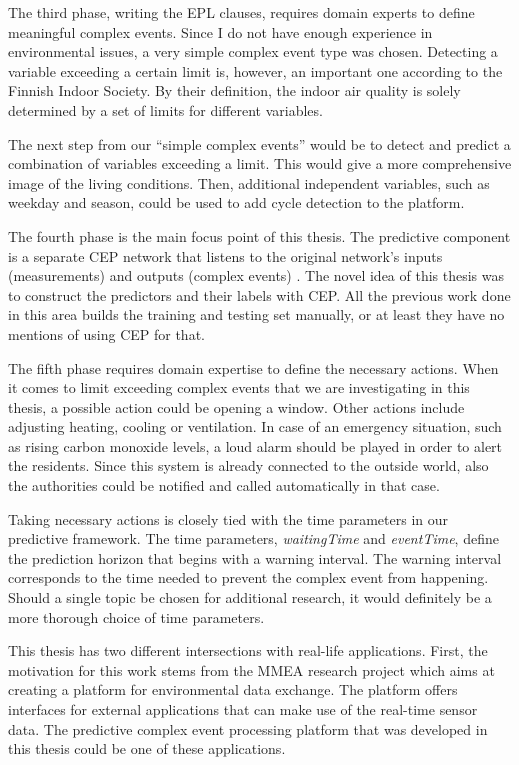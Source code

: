 The third phase, writing the EPL clauses, requires domain experts to define meaningful complex events. Since I do not have enough experience in environmental issues, a very simple complex event type was chosen. Detecting a variable exceeding a certain limit is, however, an important one according to the Finnish Indoor Society. By their definition, the indoor air quality is solely determined by a set of limits for different variables. \cite{sisailmaluokitus08}

The next step from our ``simple complex events'' would be to detect and predict a combination of variables exceeding a limit. This would give a more comprehensive image of the living conditions. Then, additional independent variables, such as weekday and season, could be used to add cycle detection to the platform. 

The fourth phase is the main focus point of this thesis. The predictive component is a separate CEP network that listens to the original network's inputs (measurements) and outputs (complex events) \cite{Fulop12}. The novel idea of this thesis was to construct the predictors and their labels with CEP. All the previous work done in this area builds the training and testing set manually, or at least they have no mentions of using CEP for that.

The fifth phase requires domain expertise to define the necessary actions. When it comes to limit exceeding complex events that we are investigating in this thesis, a possible action could be opening a window. Other actions include adjusting heating, cooling or ventilation. In case of an emergency situation, such as rising carbon monoxide levels, a loud alarm should be played in order to alert the residents. Since this system is already connected to the outside world, also the authorities could be notified and called automatically in that case.

Taking necessary actions is closely tied with the time parameters in our predictive framework. The time parameters, \emph{waitingTime} and \emph{eventTime}, define the prediction horizon that begins with a warning interval. The warning interval corresponds to the time needed to prevent the complex event from happening. Should a single topic be chosen for additional research, it would definitely be a more  thorough choice of time parameters.

This thesis has two different intersections with real-life applications. First, the motivation for this work stems from the MMEA research project which aims at creating a platform for environmental data exchange. The platform offers interfaces for external applications that can make use of the real-time sensor data. The predictive complex event processing platform that was developed in this thesis could be one of these applications.

